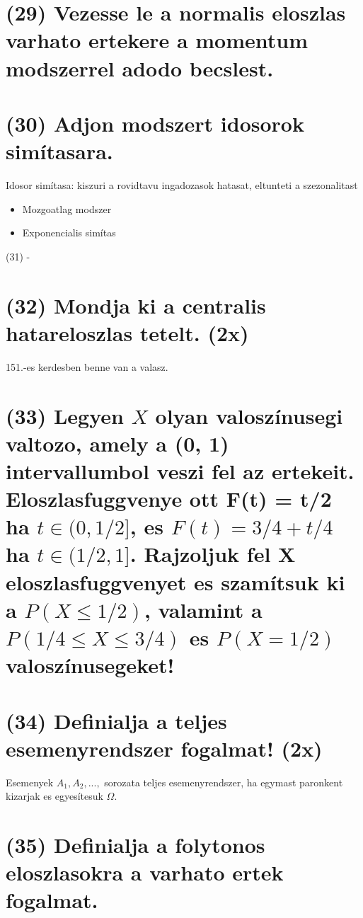 \documentclass[12p]{article}
\begin{document}
\section{(29) Vezesse le a normalis eloszlas varhato ertekere a momentum modszerrel adodo becslest.}

\section{(30) Adjon modszert idosorok simítasara.}

Idosor simítasa: kiszuri a rovidtavu ingadozasok hatasat,
eltunteti a szezonalitast

\begin{itemize}
	\item Mozgoatlag modszer
	\item Exponencialis simítas
\end{itemize}

(31) -

\section{(32) Mondja ki a centralis hatareloszlas tetelt. (2x)}

151.-es kerdesben benne van a valasz.

\section{(33) Legyen $X$ olyan valoszínusegi valtozo, amely a (0, 1) intervallumbol veszi fel az ertekeit. Eloszlasfuggvenye ott F(t) = t/2 ha $t \in (0, 1/2]$, es $F(t) = 3/4 + t/4$ ha $t \in (1/2, 1]$. Rajzoljuk fel X eloszlasfuggvenyet es szamítsuk ki a $P(X \leq 1/2)$, valamint a $P(1/4 \leq X \leq 3/4)$ es $P(X = 1/2)$ valoszínusegeket!}

\section{(34) Definialja a teljes esemenyrendszer fogalmat! (2x)}

Esemenyek $A_1, A_2, ...,$ sorozata teljes esemenyrendszer, ha
egymast paronkent kizarjak es egyesítesuk $\Omega$.

\section{(35) Definialja a folytonos eloszlasokra a varhato ertek fogalmat.}
\end{document}
